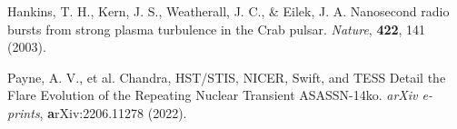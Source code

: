 \documentclass{nature_plusfigure}
\newcommand{\nat}{{Nature}}
\newcommand{\araa}{Annual Review of Astronomy and Astrophysics}
\begin{document}
\begin{thebibliography}{100}
 Hankins, T. H., Kern, J. S., Weatherall, J. C., \& Eilek, J. A. Nanosecond radio bursts from strong plasma turbulence in the Crab pulsar. \emph{\nat}, \textbf{422}, 141 (2003). 

 Payne, A. V., et al. Chandra, HST/STIS, NICER, Swift, and TESS Detail the Flare Evolution of the Repeating Nuclear Transient ASASSN-14ko. \emph{arXiv e-prints}, \textbf arXiv:2206.11278 (2022). 




%
%
%


\end{thebibliography}

\begin{small}
\begin{affiliations}
\label{sec:affiliations}


\end{affiliations}
\end{small}
\end{document}

